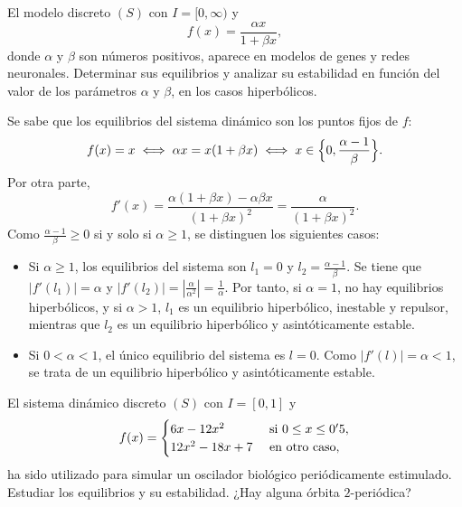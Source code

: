 \documentclass[11pt]{report}
\begin{document}
\begin{exercise}
    El modelo discreto $(S)$ con $I =[0,\infty)$ y
    \[f(x) = \frac{\alpha x}{1+\beta x},\]
    donde $\alpha$ y $\beta$ son números positivos, aparece en modelos de genes y redes neuronales. Determinar sus equilibrios y analizar su estabilidad en función del valor de los parámetros $\alpha$ y $\beta$, en los casos hiperbólicos.
\end{exercise}

\begin{solution}
    Se sabe que los equilibrios del sistema dinámico son los puntos fijos de $f$:
    \begin{align*}
        f(x) = x \iff \alpha x = x(1+\beta x) \iff x \in \Bigl\{0,\frac{\alpha-1}{\beta}\Bigr\}.
    \end{align*}
    Por otra parte,
    \[f'(x) = \frac{\alpha(1+\beta x) - \alpha\beta x}{(1+\beta x)^2} = \frac{\alpha}{(1+\beta x)^2}.\]
    Como $\frac{\alpha-1}{\beta} \geq 0$ si y solo si $\alpha \geq 1$, se distinguen los siguientes casos:
    \begin{itemize}
        \item Si $\alpha \geq 1$, los equilibrios del sistema son $l_1 = 0$ y $l_2 = \frac{\alpha - 1}{\beta}$. Se tiene que $|f'(l_1)| = \alpha$ y $|f'(l_2)| = |\frac{\alpha}{\alpha^2}| = \frac{1}{\alpha}$. Por tanto, si $\alpha = 1$, no hay equilibrios hiperbólicos, y si $\alpha > 1$, $l_1$ es un equilibrio hiperbólico, inestable y repulsor, mientras que $l_2$ es un equilibrio hiperbólico y asintóticamente estable.
        \item Si $0 < \alpha < 1$, el único equilibrio del sistema es $l = 0$. Como $|f'(l)| = \alpha < 1$, se trata de un equilibrio hiperbólico y asintóticamente estable.
    \end{itemize}
\end{solution}

\begin{exercise}
    El sistema dinámico discreto $(S)$ con $I=[0,1]$ y
    \[f(x) = \begin{cases}
        6x-12x^2 & $ si $ 0 \leq x \leq 0'5, \\
        12x^2 - 18x + 7 & $ en otro caso$,
    \end{cases}\]
    ha sido utilizado para simular un oscilador biológico periódicamente estimulado. Estudiar los equilibrios y su estabilidad. ¿Hay alguna órbita $2$-periódica?
\end{exercise}
\end{document}
